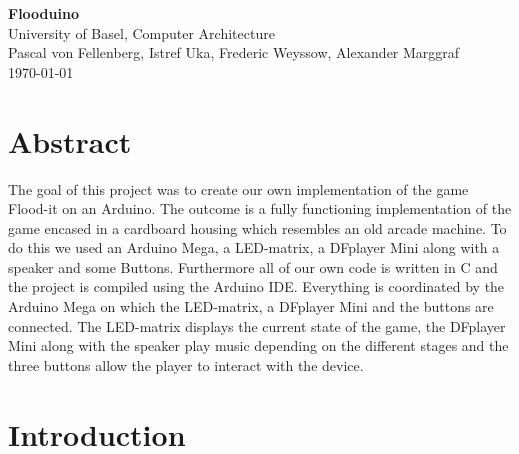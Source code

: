 \documentclass[12pt, a4paper]{article}
\begin{document}
\begin{titlepage}
\begin{center}
{\Huge \textbf{Flooduino}}\\
University of Basel, Computer Architecture\\
Pascal von Fellenberg, Istref Uka, Frederic Weyssow, Alexander Marggraf\\
\today
\end{center}
\end{titlepage}

\section*{Abstract}

The goal of this project was to create our own implementation of the game Flood-it on an Arduino.  The outcome is a fully functioning implementation of the game encased in a cardboard housing which resembles an old arcade machine. To do this we used an Arduino Mega, a LED-matrix, a DFplayer Mini along with a speaker and some Buttons. Furthermore all of our own code is written in C and the project is compiled using the Arduino IDE. Everything is coordinated by the Arduino Mega on which the LED-matrix, a DFplayer Mini and the buttons are connected. The LED-matrix displays the current state of the game, the DFplayer Mini along with the speaker play music depending on the different stages and the three buttons allow the player to interact with the device.

\section*{Introduction}
\end{document}
